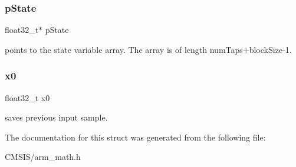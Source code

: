 \subsubsection{\texorpdfstring{pState}{pState}}
{\footnotesize\ttfamily float32\+\_\+t$\ast$ p\+State}

points to the state variable array. The array is of length num\+Taps+block\+Size-\/1. \mbox{\label{structarm__lms__norm__instance__f32_ab56b6f83c5b324c3ef620474b6e5a6e1}} 
\subsubsection{\texorpdfstring{x0}{x0}}
{\footnotesize\ttfamily float32\+\_\+t x0}

saves previous input sample. 

The documentation for this struct was generated from the following file\+:\begin{DoxyCompactItemize}
\item 
C\+M\+S\+I\+S/arm\+\_\+math.\+h\end{DoxyCompactItemize}
